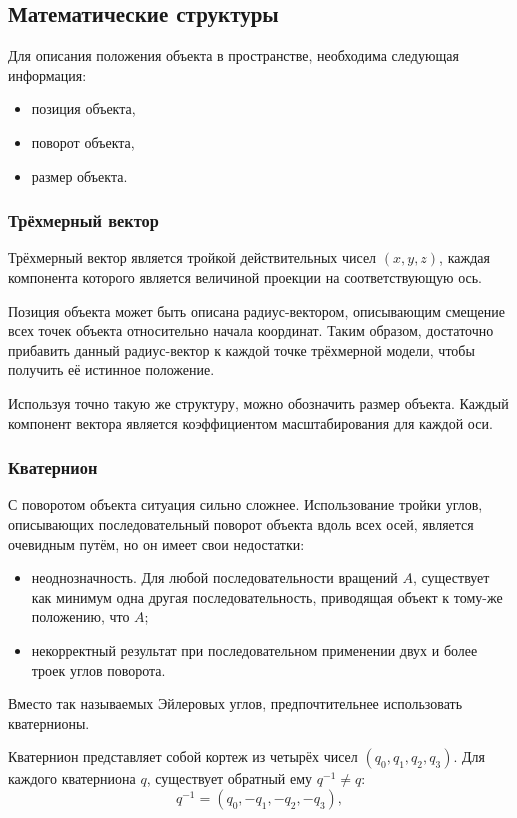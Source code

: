 \documentclass[a4paper, 14pt]{report}
\begin{document}
	\subsection{Математические структуры}
	Для описания положения объекта в пространстве, необходима следующая информация:
	\begin{itemize}
		\item позиция объекта,
		\item поворот объекта,
		\item размер объекта.
	\end{itemize}
	
	\subsubsection{Трёхмерный вектор}
	Трёхмерный вектор является тройкой действительных чисел $(x, y, z)$, каждая компонента которого является величиной проекции на соответствующую ось.
	
	Позиция объекта может быть описана радиус-вектором, описывающим смещение всех точек объекта относительно начала координат. Таким образом, достаточно прибавить данный радиус-вектор к каждой точке трёхмерной модели, чтобы получить её истинное положение.
	
	Используя точно такую же структуру, можно обозначить размер объекта. Каждый компонент вектора является коэффициентом масштабирования для каждой оси.
		
	\subsubsection{Кватернион}
	С поворотом объекта ситуация сильно сложнее. Использование тройки углов, описывающих последовательный поворот объекта вдоль всех осей, является очевидным путём, но он имеет свои недостатки:
	\begin{itemize}
		\item неоднозначность. Для любой последовательности вращений $A$, существует как минимум одна другая последовательность, приводящая объект к тому-же положению, что $A$;
		\item некорректный результат при последовательном применении двух и более троек углов поворота.
	\end{itemize}

	Вместо так называемых Эйлеровых углов, предпочтительнее использовать кватернионы\cite{quaternions}.
	
	Кватернион представляет собой кортеж из четырёх чисел $(q_0, q_1, q_2, q_3)$. Для каждого кватерниона $q$, существует обратный ему $q^{-1}\ne q$:
	\begin{equation}
		q^{-1}=(q_0, -q_1, -q_2, -q_3),
	\end{equation}
	
\end{document}

